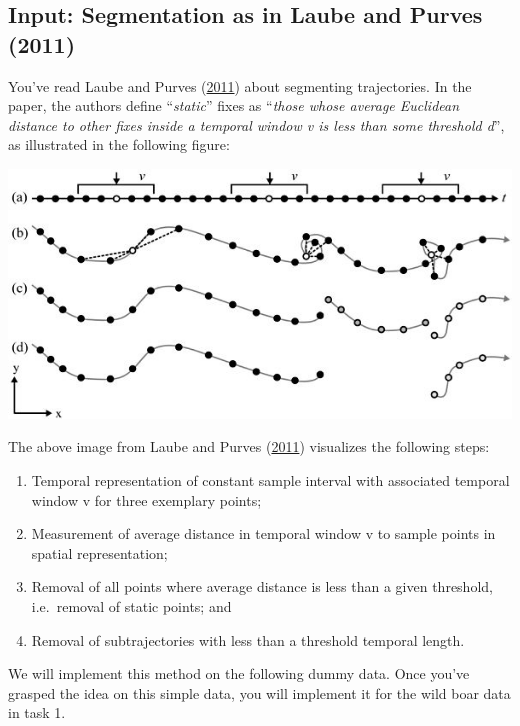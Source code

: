 \documentclass[]{book}
\providecommand{\tightlist}{%
  \setlength{\itemsep}{0pt}\setlength{\parskip}{0pt}}
\begin{document}
\hypertarget{input-segmentation-as-in-laube-and-purves-2011}{%
\subsection{Input: Segmentation as in Laube and Purves (2011)}\label{input-segmentation-as-in-laube-and-purves-2011}}

You've read Laube and Purves (\protect\hyperlink{ref-laube2011}{2011}) about segmenting trajectories. In the paper, the authors define ``\emph{static}'' fixes as ``\emph{those whose average Euclidean distance to other fixes inside a temporal window v is less than some threshold d}'', as illustrated in the following figure:

\includegraphics{02_Images/laube_2011.jpg}

The above image from Laube and Purves (\protect\hyperlink{ref-laube2011}{2011}) visualizes the following steps:

\begin{enumerate}
\def\labelenumi{(\alph{enumi})}
\tightlist
\item
  Temporal representation of constant sample interval with associated temporal window v for three exemplary points;
\item
  Measurement of average distance in temporal window v to sample points in spatial representation;
\item
  Removal of all points where average distance is less than a given threshold, i.e.~removal of static points; and
\item
  Removal of subtrajectories with less than a threshold temporal length.
\end{enumerate}

We will implement this method on the following dummy data. Once you've grasped the idea on this simple data, you will implement it for the wild boar data in task 1.
\end{document}
